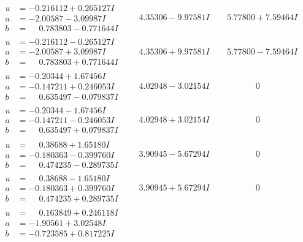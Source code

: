 \documentclass[1p]{elsarticle_modified}
\theoremstyle{definition}
\begin{document}
$$\begin{array}{c|c|c}
\begin{aligned}
u &= -0.216112 + 0.265127 I \\
a &= -2.00587 - 3.09987 I \\
b &= \phantom{-}0.783803 - 0.771644 I\end{aligned}
 & \phantom{-}4.35306 - 9.97581 I & \phantom{-}5.77800 + 7.59464 I \\ \hline\begin{aligned}
u &= -0.216112 - 0.265127 I \\
a &= -2.00587 + 3.09987 I \\
b &= \phantom{-}0.783803 + 0.771644 I\end{aligned}
 & \phantom{-}4.35306 + 9.97581 I & \phantom{-}5.77800 - 7.59464 I \\ \hline\begin{aligned}
u &= -0.20344 + 1.67456 I \\
a &= -0.147211 + 0.246053 I \\
b &= \phantom{-}0.635497 - 0.079837 I\end{aligned}
 & \phantom{-}4.02948 - 3.02154 I & \phantom{-0.000000 } 0 \\ \hline\begin{aligned}
u &= -0.20344 - 1.67456 I \\
a &= -0.147211 - 0.246053 I \\
b &= \phantom{-}0.635497 + 0.079837 I\end{aligned}
 & \phantom{-}4.02948 + 3.02154 I & \phantom{-0.000000 } 0 \\ \hline\begin{aligned}
u &= \phantom{-}0.38688 + 1.65180 I \\
a &= -0.180363 - 0.399760 I \\
b &= \phantom{-}0.474235 - 0.289735 I\end{aligned}
 & \phantom{-}3.90945 - 5.67294 I & \phantom{-0.000000 } 0 \\ \hline\begin{aligned}
u &= \phantom{-}0.38688 - 1.65180 I \\
a &= -0.180363 + 0.399760 I \\
b &= \phantom{-}0.474235 + 0.289735 I\end{aligned}
 & \phantom{-}3.90945 + 5.67294 I & \phantom{-0.000000 } 0 \\ \hline\begin{aligned}
u &= \phantom{-}0.163849 + 0.246118 I \\
a &= -1.90561 + 3.02548 I \\
b &= -0.723585 + 0.817225 I\end{aligned}

\end{array}$$
\end{document}
